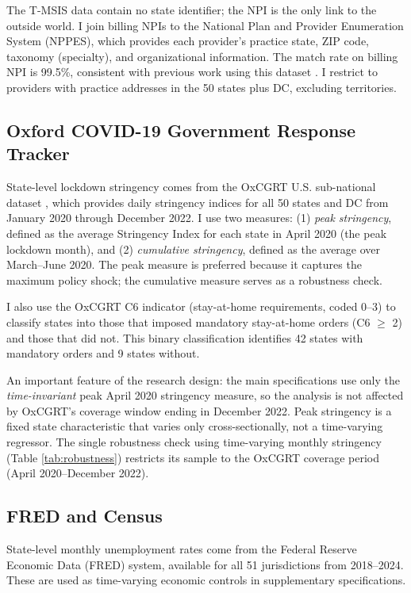 \documentclass[12pt]{article}
\begin{document}
The T-MSIS data contain no state identifier; the NPI is the only link to the outside world. I join billing NPIs to the National Plan and Provider Enumeration System (NPPES), which provides each provider's practice state, ZIP code, taxonomy (specialty), and organizational information. The match rate on billing NPI is 99.5\%, consistent with previous work using this dataset \citep{hhs2026tmsis}. I restrict to providers with practice addresses in the 50 states plus DC, excluding territories.

\subsection{Oxford COVID-19 Government Response Tracker}

State-level lockdown stringency comes from the OxCGRT U.S. sub-national dataset \citep{hale2021global}, which provides daily stringency indices for all 50 states and DC from January 2020 through December 2022. I use two measures: (1) \textit{peak stringency}, defined as the average Stringency Index for each state in April 2020 (the peak lockdown month), and (2) \textit{cumulative stringency}, defined as the average over March--June 2020. The peak measure is preferred because it captures the maximum policy shock; the cumulative measure serves as a robustness check.

I also use the OxCGRT C6 indicator (stay-at-home requirements, coded 0--3) to classify states into those that imposed mandatory stay-at-home orders (C6 $\geq$ 2) and those that did not. This binary classification identifies 42 states with mandatory orders and 9 states without.

An important feature of the research design: the main specifications use only the \textit{time-invariant} peak April 2020 stringency measure, so the analysis is not affected by OxCGRT's coverage window ending in December 2022. Peak stringency is a fixed state characteristic that varies only cross-sectionally, not a time-varying regressor. The single robustness check using time-varying monthly stringency (Table \ref{tab:robustness}) restricts its sample to the OxCGRT coverage period (April 2020--December 2022).

\subsection{FRED and Census}

State-level monthly unemployment rates come from the Federal Reserve Economic Data (FRED) system, available for all 51 jurisdictions from 2018--2024. These are used as time-varying economic controls in supplementary specifications.
\end{document}
